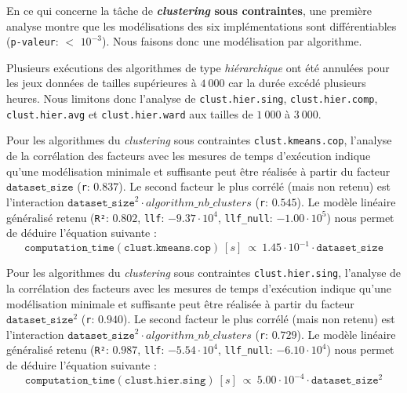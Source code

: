 			
			En ce qui concerne la tâche de \textbf{\textit{clustering} sous contraintes}, une première analyse montre que les modélisations des six implémentations sont différentiables (\texttt{p-valeur}: $<$ \texttt{$10^{-3}$}). Nous faisons donc une modélisation par algorithme.
			
			\begin{leftBarWarning}
				Plusieurs exécutions des algorithmes de type \textit{hiérarchique} ont été annulées pour les jeux données de tailles supérieures à $4~000$ car la durée excédé plusieurs heures.
				Nous limitons donc l'analyse de \texttt{clust.hier.sing}, \texttt{clust.hier.comp}, \texttt{clust.hier.avg} et \texttt{clust.hier.ward} aux tailles de $1~000$ à $3~000$.
			\end{leftBarWarning}
			
			Pour les algorithmes du \textit{clustering} sous contraintes \texttt{clust.kmeans.cop}, l'analyse de la corrélation des facteurs avec les mesures de temps d'exécution indique qu'une modélisation minimale et suffisante peut être réalisée à partir du facteur $\texttt{dataset\_size}$ (\texttt{r}: $0.837$).
			Le second facteur le plus corrélé (mais non retenu) est l'interaction $\texttt{dataset\_size}^{2} \cdot algorithm\_nb\_clusters$ (\texttt{r}: $0.545$).
			Le modèle linéaire généralisé retenu (\texttt{R²}: $0.802$, \texttt{llf}: $-9.37 \cdot 10^{4}$, \texttt{llf\_null}: $-1.00 \cdot 10^{5}$) nous permet de déduire l'équation suivante :
			\begin{equation}
				\texttt{computation\_time}(\texttt{clust.kmeans.cop})~[s]~
				\propto~1.45 \cdot 10^{-1} \cdot \texttt{dataset\_size}
			\end{equation}
			
			Pour les algorithmes du \textit{clustering} sous contraintes \texttt{clust.hier.sing}, l'analyse de la corrélation des facteurs avec les mesures de temps d'exécution indique qu'une modélisation minimale et suffisante peut être réalisée à partir du facteur $\texttt{dataset\_size}^{2}$ (\texttt{r}: $0.940$).
			Le second facteur le plus corrélé (mais non retenu) est l'interaction $\texttt{dataset\_size}^{2} \cdot algorithm\_nb\_clusters$ (\texttt{r}: $0.729$).
			Le modèle linéaire généralisé retenu (\texttt{R²}: $0.987$, \texttt{llf}: $-5.54 \cdot 10^{4}$, \texttt{llf\_null}: $-6.10 \cdot 10^{4}$) nous permet de déduire l'équation suivante :
			\begin{equation}
				\texttt{computation\_time}(\texttt{clust.hier.sing})~[s]~
				\propto~5.00 \cdot 10^{-4} \cdot \texttt{dataset\_size}^{2}
			\end{equation}
			
